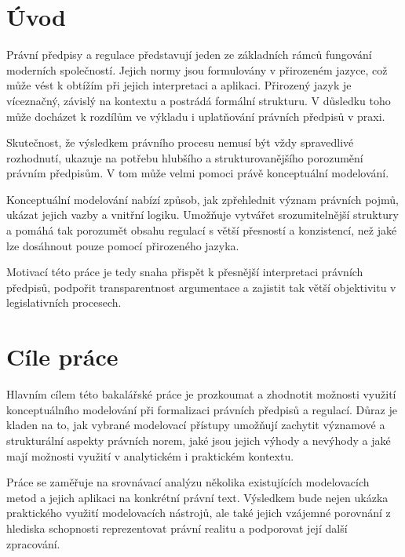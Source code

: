 
\setcounter{page}{1}
\chapter{Úvod}

Právní předpisy a regulace představují jeden ze základních rámců fungování moderních společností. Jejich normy jsou formulovány v přirozeném jazyce, což může vést k obtížím při jejich interpretaci a aplikaci. Přirozený jazyk je víceznačný, závislý na kontextu a postrádá formální strukturu. V důsledku toho může docházet k rozdílům ve výkladu i uplatňování právních předpisů v praxi.

Skutečnost, že výsledkem právního procesu nemusí být vždy spravedlivé rozhodnutí, ukazuje na potřebu hlubšího a strukturovanějšího porozumění právním předpisům. V tom může velmi pomoci právě konceptuální modelování.

Konceptuální modelování nabízí způsob, jak zpřehlednit význam právních pojmů, ukázat jejich vazby a vnitřní logiku. Umožňuje vytvářet srozumitelnější struktury a pomáhá tak porozumět obsahu regulací s větší přesností a konzistencí, než jaké lze dosáhnout pouze pomocí přirozeného jazyka.

Motivací této práce je tedy snaha přispět k přesnější interpretaci právních předpisů, podpořit transparentnost argumentace a zajistit tak větší objektivitu v legislativních procesech.


\chapter{Cíle práce}
\label{sec:cíle-práce}
Hlavním cílem této bakalářské práce je prozkoumat a zhodnotit možnosti využití konceptuálního modelování při formalizaci právních předpisů a regulací. Důraz je kladen na to, jak vybrané modelovací přístupy umožňují zachytit významové a strukturální aspekty právních norem, jaké jsou jejich výhody a nevýhody a jaké mají možnosti využití v analytickém i praktickém kontextu.

Práce se zaměřuje na srovnávací analýzu několika existujících modelovacích metod a jejich aplikaci na konkrétní právní text. Výsledkem bude nejen ukázka praktického využití modelovacích nástrojů, ale také jejich vzájemné porovnání z hlediska schopnosti reprezentovat právní realitu a podporovat její další zpracování.

